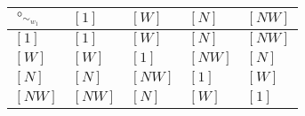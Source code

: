 \begin{tabularx}{0.6\textwidth}{l|llll}
$\circ_{\sim_{w_{1}}}$ & $[1]$ & $[W]$ & $[N]$ & $[NW]$ \\
\hline
$[1]$ & $[1]$ & $[W]$ & $[N]$ & $[NW]$ \\
$[W]$ & $[W]$ & $[1]$ & $[NW]$ & $[N]$ \\
$[N]$ & $[N]$ & $[NW]$ & $[1]$ & $[W]$ \\
$[NW]$ & $[NW]$ & $[N]$ & $[W]$ & $[1]$ \\
\end{tabularx}
